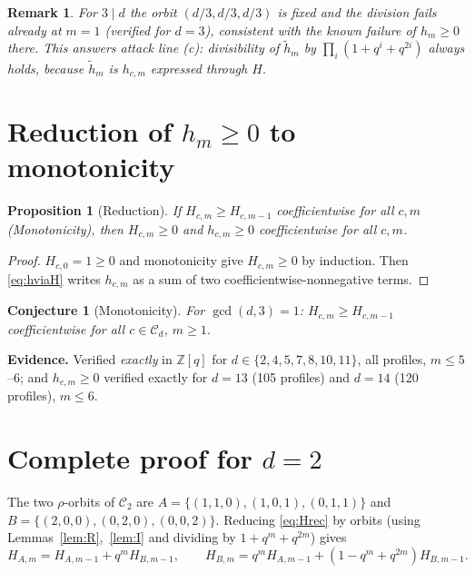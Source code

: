 \documentclass[11pt]{article}
\newtheorem{proposition}[theorem]{Proposition}
\newtheorem{conjecture}[theorem]{Conjecture}
\newtheorem{remark}[theorem]{Remark}
\begin{document}
\begin{remark}
For $3\mid d$ the orbit $(d/3,d/3,d/3)$ is fixed and the division fails already at $m=1$
(verified for $d=3$), consistent with the known failure of $h_m\ge0$ there. This answers
attack line (c): divisibility of $\tilde h_m$ by $\prod_i(1+q^i+q^{2i})$ always holds,
because $\tilde h_m$ \emph{is} $h_{c,m}$ expressed through $H$.
\end{remark}

\section{Reduction of $h_m\ge0$ to monotonicity}

\begin{proposition}[Reduction]\label{prop:red}
If $H_{c,m}\ge H_{c,m-1}$ coefficientwise for all $c,m$ (Monotonicity), then
$H_{c,m}\ge 0$ and $h_{c,m}\ge0$ coefficientwise for all $c,m$.
\end{proposition}

\begin{proof}
$H_{c,0}=1\ge0$ and monotonicity give $H_{c,m}\ge0$ by induction. Then \eqref{eq:hviaH}
writes $h_{c,m}$ as a sum of two coefficientwise-nonnegative terms.
\end{proof}

\begin{conjecture}[Monotonicity]\label{conj:mono}
For $\gcd(d,3)=1$: $H_{c,m}\ge H_{c,m-1}$ coefficientwise for all $c\in\mathcal{C}_d$, $m\ge1$.
\end{conjecture}

\noindent\textbf{Evidence.} Verified \emph{exactly} in $\mathbb{Z}[q]$ for
$d\in\{2,4,5,7,8,10,11\}$, all profiles, $m\le 5$--$6$; and $h_{c,m}\ge0$ verified exactly
for $d=13$ (105 profiles) and $d=14$ (120 profiles), $m\le 6$.

\section{Complete proof for $d=2$}

The two $\rho$-orbits of $\mathcal{C}_2$ are $A=\{(1,1,0),(1,0,1),(0,1,1)\}$ and
$B=\{(2,0,0),(0,2,0),(0,0,2)\}$. Reducing \eqref{eq:Hrec} by orbits (using
Lemmas~\ref{lem:R},~\ref{lem:I} and dividing by $1+q^m+q^{2m}$) gives
\begin{equation}\label{eq:d2}
H_{A,m}=H_{A,m-1}+q^m H_{B,m-1},\qquad
H_{B,m}=q^m H_{A,m-1}+(1-q^m+q^{2m})H_{B,m-1}.
\end{equation}
\end{document}
